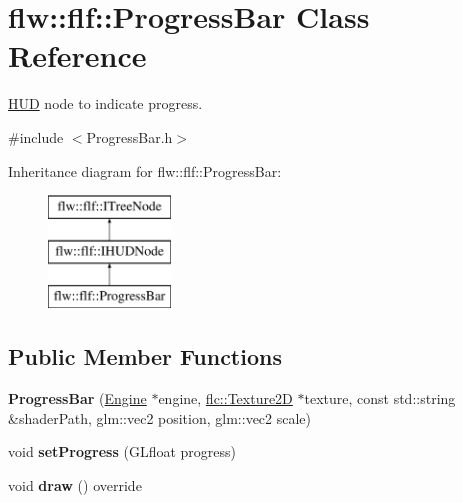 \hypertarget{classflw_1_1flf_1_1ProgressBar}{}\section{flw\+:\+:flf\+:\+:Progress\+Bar Class Reference}
\label{classflw_1_1flf_1_1ProgressBar}


\hyperlink{classflw_1_1flf_1_1HUD}{H\+UD} node to indicate progress.  




{\ttfamily \#include $<$Progress\+Bar.\+h$>$}

Inheritance diagram for flw\+:\+:flf\+:\+:Progress\+Bar\+:\begin{figure}[H]
\begin{center}
\leavevmode
\includegraphics[height=3.000000cm]{classflw_1_1flf_1_1ProgressBar}
\end{center}
\end{figure}
\subsection*{Public Member Functions}
\begin{DoxyCompactItemize}
\item 
{\bfseries Progress\+Bar} (\hyperlink{classflw_1_1Engine}{Engine} $\ast$engine, \hyperlink{classflw_1_1flc_1_1Texture2D}{flc\+::\+Texture2D} $\ast$texture, const std\+::string \&shader\+Path, glm\+::vec2 position, glm\+::vec2 scale)\hypertarget{classflw_1_1flf_1_1ProgressBar_a5ec988f1fa0158fe5a06475eee332879}{}\label{classflw_1_1flf_1_1ProgressBar_a5ec988f1fa0158fe5a06475eee332879}

\item 
void {\bfseries set\+Progress} (G\+Lfloat progress)\hypertarget{classflw_1_1flf_1_1ProgressBar_a5c21170c237fac168ff0a034b54f60b9}{}\label{classflw_1_1flf_1_1ProgressBar_a5c21170c237fac168ff0a034b54f60b9}

\item 
void {\bfseries draw} () override\hypertarget{classflw_1_1flf_1_1ProgressBar_ab1e126c34f5ed4047e0fc2471fabc94b}{}\label{classflw_1_1flf_1_1ProgressBar_ab1e126c34f5ed4047e0fc2471fabc94b}

\end{DoxyCompactItemize}
